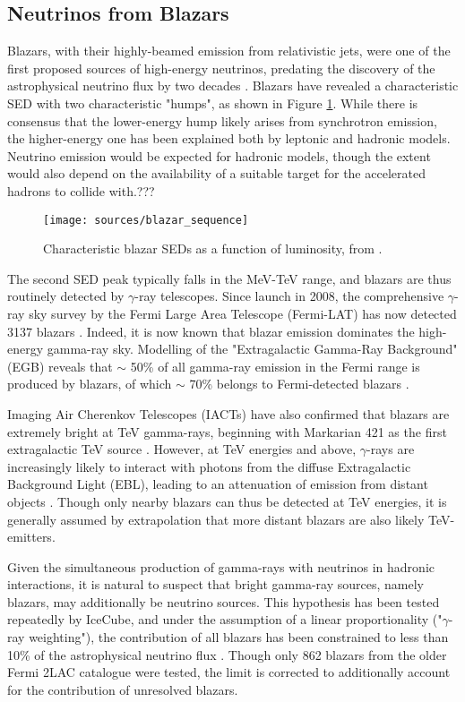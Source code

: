 \subsection{Neutrinos from Blazars}
Blazars, with their highly-beamed emission from relativistic jets, were one of the first proposed sources of high-energy neutrinos, predating the discovery of the astrophysical neutrino flux by two decades . Blazars have revealed a characteristic SED with two characteristic "humps", as shown in Figure \ref{fig:blazar_sequence}. While there is consensus that the lower-energy hump likely arises from synchrotron emission,  the higher-energy one has been explained both by leptonic and hadronic models. Neutrino emission would be expected for hadronic models, though the extent would also depend on the availability of a suitable target for the accelerated hadrons to collide with.???

\begin{figure}[!ht]
	\centering \texttt{[image: sources/blazar\_sequence]}
	\caption{Characteristic blazar SEDs as a function of luminosity, from \cite{16_blazar_sequence}.}
	\label{fig:blazar_sequence}
\end{figure}

The second SED peak typically falls in the MeV-TeV range, and blazars are thus routinely detected by $\gamma$-ray telescopes. Since launch in 2008, the comprehensive $\gamma$-ray sky survey by the Fermi Large Area Telescope (Fermi-LAT) has now detected 3137 blazars . Indeed, it is now known that blazar emission dominates the high-energy gamma-ray sky. Modelling of the "Extragalactic Gamma-Ray Background" (EGB) reveals that $\sim$ 50\% of all gamma-ray emission in the Fermi range is produced by blazars, of which $\sim$ 70\% belongs to Fermi-detected blazars .  

Imaging Air Cherenkov Telescopes (IACTs) have also confirmed that blazars are extremely bright at TeV gamma-rays, beginning with Markarian 421 as the first extragalactic TeV source . However, at TeV energies and above, $\gamma$-rays are increasingly likely to interact with photons from the diffuse Extragalactic Background Light (EBL), leading to an attenuation of emission from distant objects . Though only nearby blazars can thus be detected at TeV energies, it is generally assumed by extrapolation that more distant blazars are also likely TeV-emitters.

 Given the simultaneous production of gamma-rays with neutrinos in hadronic interactions, it is natural to suspect that bright gamma-ray sources, namely blazars, may additionally be neutrino sources. This hypothesis has been tested repeatedly by IceCube, and under the assumption of a linear proportionality ("$\gamma$-ray weighting"), the contribution of all blazars has been constrained to less than 10\% of the astrophysical neutrino flux . Though only 862 blazars from the older Fermi 2LAC catalogue were tested, the limit is corrected to additionally account for the contribution of unresolved blazars. 
 
